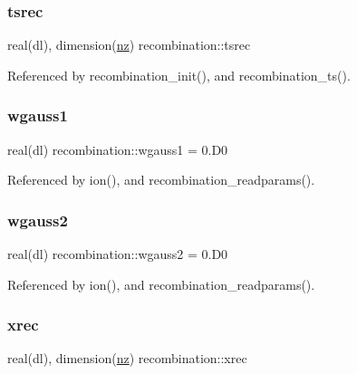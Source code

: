 \subsubsection{\texorpdfstring{tsrec}{tsrec}}
{\footnotesize\ttfamily real(dl), dimension(\mbox{\hyperlink{namespacerecombination_a2ebf98b22953bfe18fb372dd8e330d3e}{nz}}) recombination\+::tsrec\hspace{0.3cm}{\ttfamily [private]}}



Referenced by recombination\+\_\+init(), and recombination\+\_\+ts().

\mbox{\label{namespacerecombination_ab96e636bde8533901e6404afddd90371}} 
\subsubsection{\texorpdfstring{wgauss1}{wgauss1}}
{\footnotesize\ttfamily real(dl) recombination\+::wgauss1 = 0.\+D0\hspace{0.3cm}{\ttfamily [private]}}



Referenced by ion(), and recombination\+\_\+readparams().

\mbox{\label{namespacerecombination_ae8e9ce09a4cbc8282433bb03744dee31}} 
\subsubsection{\texorpdfstring{wgauss2}{wgauss2}}
{\footnotesize\ttfamily real(dl) recombination\+::wgauss2 = 0.\+D0\hspace{0.3cm}{\ttfamily [private]}}



Referenced by ion(), and recombination\+\_\+readparams().

\mbox{\label{namespacerecombination_a43d25f6d69d2b60682ef49868e8f70cd}} 
\subsubsection{\texorpdfstring{xrec}{xrec}}
{\footnotesize\ttfamily real(dl), dimension(\mbox{\hyperlink{namespacerecombination_a2ebf98b22953bfe18fb372dd8e330d3e}{nz}}) recombination\+::xrec\hspace{0.3cm}{\ttfamily [private]}}



